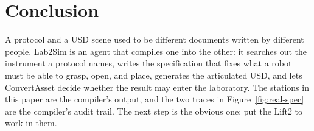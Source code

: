 \section{Conclusion}
\label{sec:conclusion}

A protocol and a USD scene used to be different documents written by
different people. Lab2Sim is an agent that compiles one into the other: it
searches out the instrument a protocol names, writes the specification that
fixes what a robot must be able to grasp, open, and place, generates the
articulated USD, and lets ConvertAsset decide whether the result may enter
the laboratory. The stations in this paper are the compiler's output, and the
two traces in Figure~\ref{fig:real-spec} are the compiler's audit trail. The
next step is the obvious one: put the Lift2 to work in them.
